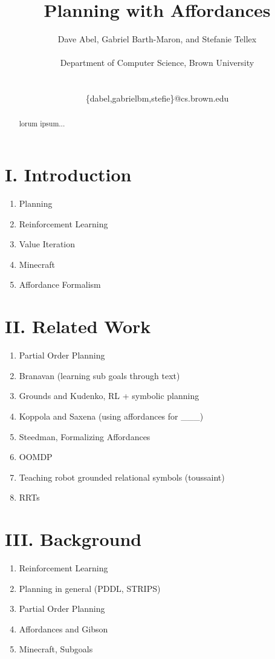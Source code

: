 \documentclass[a4paper]{article}
\title{Planning with Affordances}
\author{Dave Abel, Gabriel Barth-Maron, and Stefanie Tellex \\ \\ Department of Computer Science, Brown University \\ \\ \begin{courier}\{dabel,gabrielbm,stefie\}@cs.brown.edu\end{courier}}
\date{}
\begin{document}
\maketitle

\begin{abstract}
lorum ipsum...
\end{abstract}

\section{I. Introduction}
\begin{enumerate}
\item Planning

\item Reinforcement Learning

\item Value Iteration

\item Minecraft

\item Affordance Formalism
\end{enumerate}

\section{II. Related Work}
\begin{enumerate}
\item Partial Order Planning

\item Branavan (learning sub goals through text)

\item Grounds and Kudenko, RL + symbolic planning

\item Koppola and Saxena (using affordances for \_\_\_)

\item Steedman, Formalizing Affordances

\item OOMDP

\item Teaching robot grounded relational symbols (toussaint)

\item RRTs
\end{enumerate}
\section{III. Background}
\begin{enumerate}
\item Reinforcement Learning
\item Planning in general (PDDL, STRIPS)
\item Partial Order Planning
\item Affordances and Gibson
\item Minecraft, Subgoals
\end{enumerate}
\end{document}
